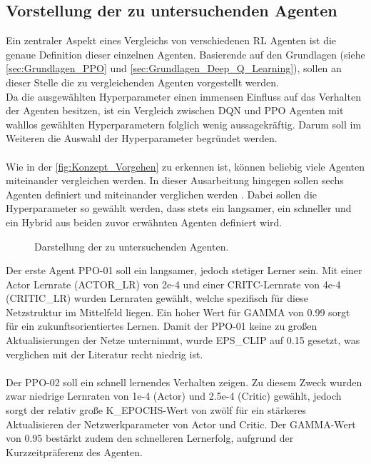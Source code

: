 \subsection{Vorstellung der zu untersuchenden Agenten} \label{subsec:Konzept_Vorstellung_Agenten}
Ein zentraler Aspekt eines Vergleichs von verschiedenen RL Agenten ist die genaue Definition dieser einzelnen Agenten. 
Basierende auf den Grundlagen (siehe \autoref{sec:Grundlagen_PPO} und \autoref{sec:Grundlagen_Deep_Q_Learning}), sollen an dieser Stelle die zu vergleichenden Agenten vorgestellt werden.\\
Da die ausgewählten Hyperparameter einen immensen Einfluss auf das Verhalten der Agenten besitzen, ist ein Vergleich zwischen DQN und PPO Agenten mit wahllos gewählten Hyperparametern folglich wenig aussagekräftig. Darum soll im Weiteren die Auswahl der Hyperparameter begründet werden.\\
\\Wie in der \autoref{fig:Konzept_Vorgehen} zu erkennen ist, können beliebig viele Agenten miteinander vergleichen werden. In dieser Ausarbeitung hingegen sollen sechs Agenten definiert und miteinander verglichen werden . Dabei sollen die Hyperparameter so gewählt werden, dass stets ein langsamer, ein schneller und ein Hybrid aus beiden zuvor erwähnten Agenten definiert wird.
\begin{figure}[H]
	\centering
	
	\caption[Agenten]{Darstellung der zu untersuchenden Agenten.}
	\label{fig:Konzept_Agenten}
\end{figure}
Der erste Agent PPO-01 soll ein langsamer, jedoch stetiger Lerner sein. Mit einer Actor Lernrate (ACTOR\_LR) von 2e-4 und einer CRITC-Lernrate von 4e-4 (CRITIC\_LR) wurden Lernraten gewählt, welche spezifisch für diese Netzstruktur im Mittelfeld liegen. Ein hoher Wert für GAMMA von 0.99 sorgt für ein zukunftsorientiertes Lernen. Damit der PPO-01 keine zu großen Aktualisierungen der Netze unternimmt, wurde EPS\_CLIP auf 0.15 gesetzt, was verglichen mit der Literatur \cite[S. 6]{PPO} recht niedrig ist.\\
\\Der PPO-02 soll ein schnell lernendes Verhalten zeigen. Zu diesem Zweck wurden zwar niedrige Lernraten von 1e-4 (Actor) und 2.5e-4 (Critic) gewählt, jedoch sorgt der relativ große K\_EPOCHS-Wert von zwölf für ein stärkeres Aktualisieren der Netzwerkparameter von Actor und Critic. Der GAMMA-Wert von 0.95 bestärkt zudem den schnelleren Lernerfolg, aufgrund der Kurzzeitpräferenz des Agenten.\\
